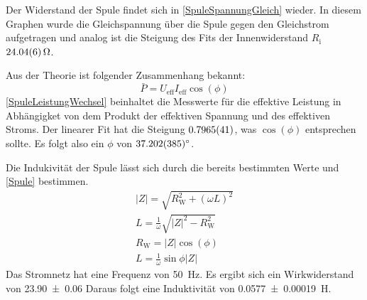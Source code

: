 \documentclass[
	a4paper,
	12pt,
	pagesize,
	ngerman
]{scrartcl}
\begin{document}
	Der Widerstand der Spule findet sich in \cref{SpuleSpannungGleich} wieder. 
	In diesem Graphen wurde die Gleichspannung über die Spule gegen den Gleichstrom aufgetragen und analog ist die Steigung des Fits der Innenwiderstand $R_\text{i}$ $\SI{24,04 \pm 0,06}{\Omega}$.

	Aus der Theorie ist folgender Zusammenhang bekannt:
	\begin{equation}
		\bar{P} = U_\text{eff} I_\text{eff} \cos(\phi)
	\end{equation}
	\cref{SpuleLeistungWechsel} beinhaltet die Messwerte für die effektive Leistung in Abhängigket von dem Produkt der effektiven Spannung und des effektiven Stroms. 
	Der linearer Fit hat die Steigung $\SI{0,7965\pm 0,0041}{}$, was $\cos(\phi)$ entsprechen sollte. 
	Es folgt also ein $\phi$ von $\ang{37,202\pm 0,385}$.

	Die Indukivität der Spule lässt sich durch die bereits bestimmten Werte und \cref{Spule} bestimmen.
	\begin{gather}
		\label{Spule}
		|Z| = \sqrt{R_\text{W}^2 + (\omega L)^2} \\
		L = \frac{1}{\omega}\sqrt{|Z|^2-R_\text{W}^2} \\
		R_\text{W} = |Z| \cos(\phi)  \\
		L = \frac{1}{\omega} \sin{\phi} |Z|
	\end{gather}
		Das Stromnetz hat eine Frequenz von \SI{50}{Hz}. %
		Es ergibt sich ein Wirkwiderstand von \SI{23,90 \pm 0,06}{\Omega}
		Daraus folgt eine Induktivität von \SI{0,0577 \pm 0,00019}{H}. %
	
\end{document}
